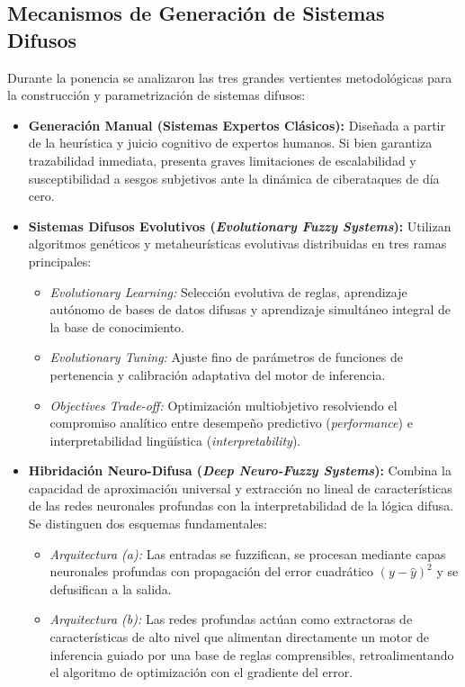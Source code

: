 \documentclass[12pt,a4paper]{article}
\begin{document}
\subsection*{Mecanismos de Generación de Sistemas Difusos}
Durante la ponencia se analizaron las tres grandes vertientes metodológicas para la construcción y parametrización de sistemas difusos:
\begin{itemize}
    \item \textbf{Generación Manual (Sistemas Expertos Clásicos):} Diseñada a partir de la heurística y juicio cognitivo de expertos humanos. Si bien garantiza trazabilidad inmediata, presenta graves limitaciones de escalabilidad y susceptibilidad a sesgos subjetivos ante la dinámica de ciberataques de día cero.
    \item \textbf{Sistemas Difusos Evolutivos (\textit{Evolutionary Fuzzy Systems}):} Utilizan algoritmos genéticos y metaheurísticas evolutivas distribuidas en tres ramas principales:
    \begin{itemize}
        \item \textit{Evolutionary Learning:} Selección evolutiva de reglas, aprendizaje autónomo de bases de datos difusas y aprendizaje simultáneo integral de la base de conocimiento.
        \item \textit{Evolutionary Tuning:} Ajuste fino de parámetros de funciones de pertenencia y calibración adaptativa del motor de inferencia.
        \item \textit{Objectives Trade-off:} Optimización multiobjetivo resolviendo el compromiso analítico entre desempeño predictivo (\textit{performance}) e interpretabilidad lingüística (\textit{interpretability}).
    \end{itemize}
    \item \textbf{Hibridación Neuro-Difusa (\textit{Deep Neuro-Fuzzy Systems}):} Combina la capacidad de aproximación universal y extracción no lineal de características de las redes neuronales profundas con la interpretabilidad de la lógica difusa. Se distinguen dos esquemas fundamentales:
    \begin{itemize}
        \item \textit{Arquitectura (a):} Las entradas se fuzzifican, se procesan mediante capas neuronales profundas con propagación del error cuadrático $(y - \hat{y})^2$ y se defusifican a la salida.
        \item \textit{Arquitectura (b):} Las redes profundas actúan como extractoras de características de alto nivel que alimentan directamente un motor de inferencia guiado por una base de reglas comprensibles, retroalimentando el algoritmo de optimización con el gradiente del error.
    \end{itemize}
\end{itemize}
\end{document}
